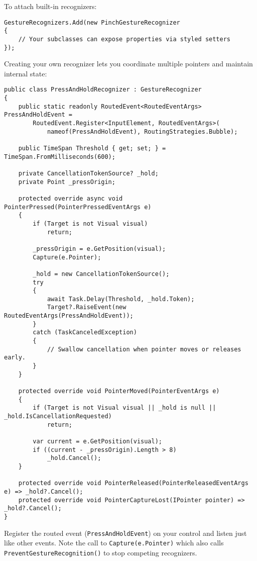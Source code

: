 To attach built-in recognizers:

\begin{lstlisting}
GestureRecognizers.Add(new PinchGestureRecognizer
{
    // Your subclasses can expose properties via styled setters
});
\end{lstlisting}

Creating your own recognizer lets you coordinate multiple pointers and
maintain internal state:

\begin{lstlisting}
public class PressAndHoldRecognizer : GestureRecognizer
{
    public static readonly RoutedEvent<RoutedEventArgs> PressAndHoldEvent =
        RoutedEvent.Register<InputElement, RoutedEventArgs>(
            nameof(PressAndHoldEvent), RoutingStrategies.Bubble);

    public TimeSpan Threshold { get; set; } = TimeSpan.FromMilliseconds(600);

    private CancellationTokenSource? _hold;
    private Point _pressOrigin;

    protected override async void PointerPressed(PointerPressedEventArgs e)
    {
        if (Target is not Visual visual)
            return;

        _pressOrigin = e.GetPosition(visual);
        Capture(e.Pointer);

        _hold = new CancellationTokenSource();
        try
        {
            await Task.Delay(Threshold, _hold.Token);
            Target?.RaiseEvent(new RoutedEventArgs(PressAndHoldEvent));
        }
        catch (TaskCanceledException)
        {
            // Swallow cancellation when pointer moves or releases early.
        }
    }

    protected override void PointerMoved(PointerEventArgs e)
    {
        if (Target is not Visual visual || _hold is null || _hold.IsCancellationRequested)
            return;

        var current = e.GetPosition(visual);
        if ((current - _pressOrigin).Length > 8)
            _hold.Cancel();
    }

    protected override void PointerReleased(PointerReleasedEventArgs e) => _hold?.Cancel();
    protected override void PointerCaptureLost(IPointer pointer) => _hold?.Cancel();
}
\end{lstlisting}

Register the routed event (\passthrough{\lstinline!PressAndHoldEvent!})
on your control and listen just like other events. Note the call to
\passthrough{\lstinline!Capture(e.Pointer)!} which also calls
\passthrough{\lstinline!PreventGestureRecognition()!} to stop competing
recognizers.

